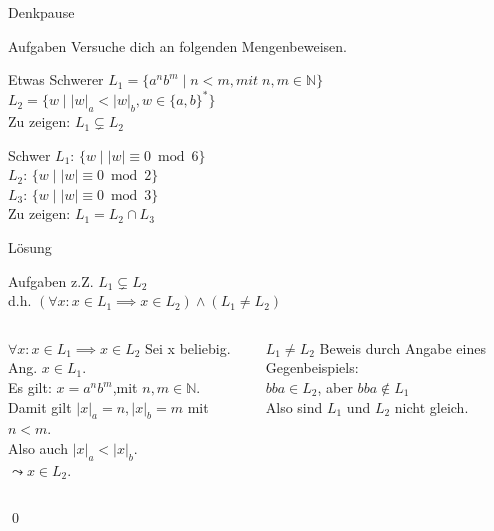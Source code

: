 {
\begin{frame}[fragile]{Denkpause}
    \begin{alertblock}{Aufgaben}
    Versuche dich an folgenden Mengenbeweisen.
    \end{alertblock}
    
    \begin{block}{Etwas Schwerer}
    $L_1=\{a^{n}b^{m} \mid n<m ,mit \; n,m\in \mathbb{N}\}$\\
    $L_2=\{w \mid |w|_a < |w|_b, w \in \{a,b\}^*\}$\\
    \vspace{0.3cm}
    Zu zeigen: $L_1 \subsetneq L_2$
    \end{block}
    \begin{block}{Schwer}
    $L_1$: $\{w\mid |w|\equiv 0 \bmod 6\}$\\
    $L_2$: $\{w\mid |w|\equiv 0 \bmod 2\}$\\
    $L_3$: $\{w\mid |w|\equiv 0 \bmod 3\}$\\
    \vspace{0.3cm}
    Zu zeigen: $L_1 = L_2 \cap L_3$
    \end{block}
\end{frame}
}

{
\begin{frame}[fragile]{Lösung}
    \begin{alertblock}{Aufgaben}
    z.Z. $L_1 \subsetneq L_2$\\
    d.h. $(\forall x: x \in L_1 \implies x \in L_2) \wedge (L_1 \neq L_2)$
    \end{alertblock}
    
    \begin{columns}
    \begin{alertblock}{$\forall x: x \in L_1 \implies x \in L_2$}
        Sei x beliebig. Ang. $x \in L_1$.\\
        Es gilt: $x=a^{n}b^{m}$,mit $n,m\in\mathbb{N}$.\\
        Damit gilt $|x|_a=n, |x|_b=m$ mit $n<m$.\\
        Also auch $|x|_a < |x|_b$.\\
        $\leadsto x \in L_2$.
    \end{alertblock}
    
    \begin{alertblock}{$L_1 \neq L_2$}
        Beweis durch Angabe eines Gegenbeispiels:\\
        $bba \in L_2$, aber $bba \notin L_1$\\
        Also sind $L_1$ und $L_2$ nicht gleich.
    \end{alertblock}
    \end{columns}
    \qed
\end{frame}
}

